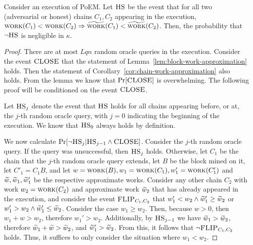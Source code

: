 \begin{lemma}
  Consider an execution of PoEM. Let $\textsc{HS}$ be the event that for all two (adversarial or honest) chains
  $C_1, C_2$ appearing in the execution,
  $\textsc{work}(C_1) < \textsc{work}(C_2) \Rightarrow \widetilde{\textsc{work}}(C_1) < \widetilde{\textsc{work}}(C_2)$.
  Then, the probability that $\lnot \textsc{HS}$ is negligible in $\kappa$.
\end{lemma}
\begin{proof}
  There are at most $Lqn$ random oracle queries in the execution.
  Consider the event $\textsc{CLOSE}$ that the statement of Lemma~\ref{lem:block-work-approximation}
  holds.
  Then the statement of Corollary~\ref{cor:chain-work-approximation} also holds.
  From the lemma we know that $\Pr[\textsc{CLOSE}]$ is overwhelming.
  The following proof will be conditioned on the event $\textsc{CLOSE}$.

  Let $\textsc{HS}_j$ denote the event that $\textsc{HS}$ holds for all chains appearing
  before, or at, the $j$-th random oracle query, with $j = 0$ indicating
  the beginning of the execution. We know that $\textsc{HS}_0$ always holds by definition.

  We now calculate $\Pr[\lnot \textsc{HS}_j | \textsc{HS}_{j - 1} \land \textsc{CLOSE}]$.
  Consider the $j$-th random oracle query.
  If the query was unsuccessful, then $\textsc{HS}_j$ holds. Otherwise, let $C_1$ be the chain
  that the $j$-th random oracle query extends, let $B$ be the block mined on it,
  let $C'_1 = C_1 B$, and let $w = \textsc{work}(B), w_1 = \textsc{work}(C_1), w'_1 = \textsc{work}(C'_1)$
  and $\widetilde{w}, \widetilde{w}_1, \widetilde{w}'_1$ be the respective approximate works.
  Consider any other chain $C_2$ with work $w_2 = \textsc{work}(C_2)$
  and approximate work $\widetilde{w}_2$
  that has already appeared in the execution,
  and consider the event $\textsc{FLIP}_{C_1,C_2}$ that
  $w'_1 < w_2 \land \widetilde{w}'_1 \geq \widetilde{w}_2$ or $w'_1 > w_2 \land \widetilde{w}'_1 \leq \widetilde{w}_2$.
  Consider the case $w_1 \geq w_2$. Then, because $w > 0$, then $w_1 + w > w_2$, therefore $w_1' > w_2$.
  Additionally, by $\textsc{HS}_{j - 1}$ we have $\widetilde{w}_1 > \widetilde{w}_2$, therefore $\widetilde{w}_1 + \widetilde{w} > \widetilde{w}_2$, and
  $\widetilde{w}_1' > \widetilde{w}_2$. From this, it follows that $\lnot \textsc{FLIP}_{C_1,C_2}$ holds.
  Thus, it suffices to only consider the situation where $w_1 < w_2$.


\end{proof}
